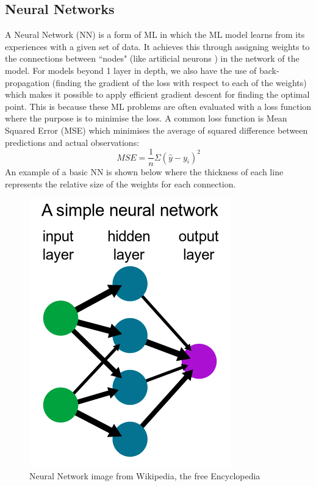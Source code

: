 \subsection{Neural Networks}
A Neural Network (NN) is a form of ML in which the ML model learns from its experiences with a given set of data. It achieves this through assigning weights to the connections between ``nodes" (like artificial neurons \cite{neurons}) in the network of the model. For models beyond 1 layer in depth, we also have the use of back-propagation (finding the gradient of the loss with respect to each of the weights) which makes it possible to apply efficient gradient descent for finding the optimal point. This is because these ML problems are often evaluated with a loss function where the purpose is to minimise the loss. A common loss function is Mean Squared Error (MSE) which minimises the average of squared difference between predictions and actual observations:
\begin{equation}
    MSE = \dfrac{1}{n} \Sigma (\hat{y} - y_i)^2
\end{equation}
An example of a basic NN is shown below where the thickness of each line represents the relative size of the weights for each connection.
\begin{figure}[htbp]
	\centering
    \includegraphics[scale=0.3]{background/neural_network.png}
	\caption{Neural Network image from Wikipedia, the free Encyclopedia}
	\label{fig:nn}
\end{figure}

